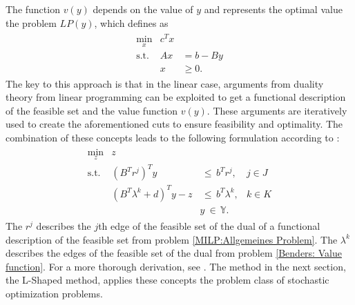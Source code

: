 The function $v(y)$ depends on the value of $y$ and represents the optimal value the problem $LP(y)$,
which \cite{ggo2} defines as
\begin{align}\label{Benders: Value function}
    \begin{array}{crl}
        \underset{x}{\min} &c^T  x       \\
            \textrm{s.t.}  & A x  &= b - By \\
                           &   x    & \geq 0 .
    \end{array}
\end{align}
The key to this approach is that in the linear case, arguments from duality theory from linear programming can be exploited to get a functional description of the feasible set and the value function $v(y)$.
These arguments are iteratively used to create the aforementioned cuts to ensure feasibility and optimality.
The combination of these concepts leads to the following formulation according to \cite{ggo2}:
\begin{align}\label{BendersFormulierung}
    \begin{array}{lccc}
          \underset{z}{\min} &z             &                   &          \\
          \textrm{s.t.}      &(B^T r^j)^T y &\, \leq \, b^T r^j,&j \in J   \\ 
                             &(B^T \lambda^k + d)^T y - z &\, \leq \, b^T\lambda^k ,& k \in K\\ 
                             &\quad                       & y\ \in \, \mathbb{Y}.                   &               
    \end{array}
\end{align}
The $r^j$ describes the $j$th edge of the feasible set of the dual of a functional description of the feasible set from problem \ref{MILP:Allgemeines Problem}.
The $\lambda^k$ describes the edges of the feasible set of the dual from problem \ref{Benders: Value function}.
For a more thorough derivation, see \cite{ggo2, floudas1995}. 
The method in the next section, the L-Shaped method, applies these concepts the problem class of stochastic optimization problems.


